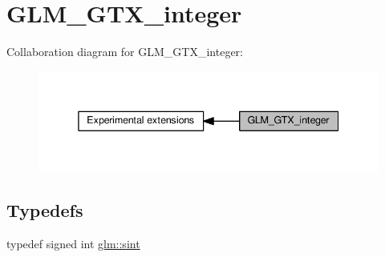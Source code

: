 \hypertarget{group__gtx__integer}{}\section{G\+L\+M\+\_\+\+G\+T\+X\+\_\+integer}
\label{group__gtx__integer}
Collaboration diagram for G\+L\+M\+\_\+\+G\+T\+X\+\_\+integer\+:
\nopagebreak
\begin{figure}[H]
\begin{center}
\leavevmode
\includegraphics[width=338pt]{d4/d07/group__gtx__integer}
\end{center}
\end{figure}
\subsection*{Typedefs}
\begin{DoxyCompactItemize}
\item 
typedef signed int \hyperlink{group__gtx__integer_ga73643e09d8c6d362418aec541fdb987d}{glm\+::sint}
\end{DoxyCompactItemize}
